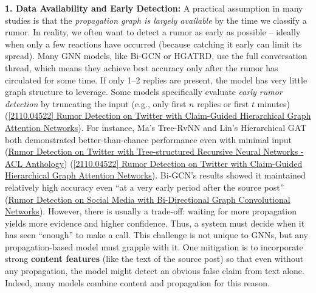 \documentclass[12pt,a4paper]{report}
\begin{document}
\textbf{1. Data Availability and \textbf{Early Detection}:} A practical assumption in many studies is that the \textit{propagation graph is largely available} by the time we classify a rumor. In reality, we often want to detect a rumor as early as possible – ideally when only a few reactions have occurred (because catching it early can limit its spread). Many GNN models, like Bi-GCN or HGATRD, use the full conversation thread, which means they achieve best accuracy only after the rumor has circulated for some time. If only 1--2 replies are present, the model has very little graph structure to leverage. Some models specifically evaluate \textit{early rumor detection} by truncating the input (e.g., only first \(n\) replies or first \(t\) minutes) (\href{https://ar5iv.org/pdf/2110.04522#:~:text=5}{[2110.04522] Rumor Detection on Twitter with Claim-Guided Hierarchical Graph Attention Networks}). For instance, Ma’s Tree-RvNN and Lin’s Hierarchical GAT both demonstrated better-than-chance performance even with minimal input (\href{https://aclanthology.org/P18-1184/#:~:text=based%20on%20a%20bottom,rumors%20at%20very%20early%20stage}{Rumor Detection on Twitter with Tree-structured Recursive Neural Networks - ACL Anthology}) (\href{https://arxiv.org/abs/2110.04522#:~:text=Claim,for%20detecting%20rumors%20at%20early}{[2110.04522] Rumor Detection on Twitter with Claim-Guided Hierarchical Graph Attention Networks}). Bi-GCN’s results showed it maintained relatively high accuracy even “at a very early period after the source post” (\href{https://ojs.aaai.org/index.php/AAAI/article/view/5393/5249#:~:text=relatively%20high%20accuracy%20at%20a,that%20structural%20features%20are%20not}{Rumor Detection on Social Media with Bi-Directional Graph Convolutional Networks}). However, there is usually a trade-off: waiting for more propagation yields more evidence and higher confidence. Thus, a system must decide when it has seen “enough” to make a call. This challenge is not unique to GNNs, but any propagation-based model must grapple with it. One mitigation is to incorporate strong \textbf{content features} (like the text of the source post) so that even without any propagation, the model might detect an obvious false claim from text alone. Indeed, many models combine content and propagation for this reason.
\end{document}
